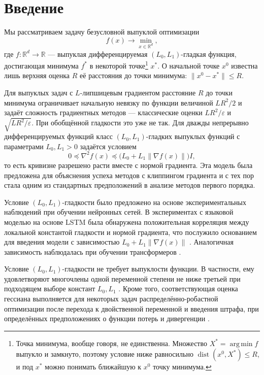 \documentclass[11pt,a4paper]{article}
\newcommand{\R}{\mathbb R}
\newcommand{\norm}[1]{\|#1\|}
\DeclareMathOperator{\argmin}{arg\,min}
\begin{document}
\section{Введение}\label{sec:intro}

Мы рассматриваем задачу безусловной выпуклой оптимизации
\[
 f(x)\to\min_{x\in\R^d},
\]
где $f:\R^d\to\R$ --- выпуклая дифференцируемая $(L_0,L_1)$-гладкая функция, достигающая минимума $f^\ast$ в некоторой точке\footnote{Точка минимума, вообще говоря, не единственна. Множество $X^\ast=\argmin f$ выпукло и замкнуто, поэтому условие ниже равносильно $\operatorname{dist}(x^0,X^\ast)\le R$, и под $x^\ast$ можно понимать ближайшую к $x^0$ точку минимума.} $x^\ast$. О начальной точке $x^0$ известна лишь верхняя оценка $R$ её расстояния до точки минимума: $\norm{x^0-x^\ast}\le R$.

Для выпуклых задач с $L$-липшицевым градиентом расстояние $R$ до точки минимума ограничивает начальную невязку по функции величиной $LR^2/2$ и задаёт сложность градиентных методов --- классические оценки $LR^2/\varepsilon$ и $\sqrt{LR^2/\varepsilon}$. При обобщённой гладкости это уже не так. Для дважды непрерывно дифференцируемых функций класс $(L_0,L_1)$-гладких выпуклых функций с параметрами $L_0,L_1>0$ задаётся условием
\[
 0\preceq\nabla^2f(x)\preceq\bigl(L_0+L_1\norm{\nabla f(x)}\bigr)I ,
\]
то есть кривизне разрешено расти вместе с нормой градиента. Эта модель была предложена для объяснения успеха методов с клиппингом градиента \citep{zhang2019gradient,zhang2020improved} и с тех пор стала одним из стандартных предположений в анализе методов первого порядка.

Условие $(L_0,L_1)$-гладкости было предложено на основе экспериментальных наблюдений при обучении нейронных сетей. В экспериментах с языковой моделью на основе LSTM была обнаружена положительная корреляция между локальной константой гладкости и нормой градиента, что послужило основанием для введения модели с зависимостью $L_0+L_1\norm{\nabla f(x)}$ \citep{zhang2019gradient}. Аналогичная зависимость наблюдалась при обучении трансформеров \citep{crawshaw2022robustness}.

Условие $(L_0,L_1)$-гладкости не требует выпуклости функции. В частности, ему удовлетворяют многочлены одной переменной степени не ниже третьей при подходящем выборе констант $L_0,L_1$ \citep{zhang2019gradient}. Кроме того, соответствующая оценка гессиана выполняется для некоторых задач распределённо-робастной оптимизации после перехода к двойственной переменной и введения штрафа, при определённых предположениях о функции потерь и дивергенции \citep{jin2021non,chen2023generalized}.
\end{document}
